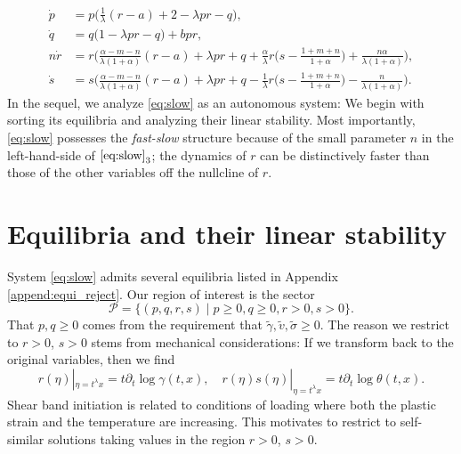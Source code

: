 \documentclass[11pt]{article}
\def\tg{{\tilde{\gamma}}}
\def\tv{{\tilde{v}}}
\def\ts{{\tilde{\sigma}}}
\theoremstyle{remark}
\begin{document}
\begin{equation}\label{eq:slow} \tag{S}
 \begin{aligned}
 \dot{p} &=p\Big(\frac{1}{\lambda}(r-a) + 2- \lambda p r -q\Big),\\
 \dot{q} &=q\Big(1 -\lambda p r -q\Big) + b p r,\\
 n\dot{r} &=r\Big(\frac{\alpha-m-n}{\lambda(1+\alpha)}(r-a) + \lambda pr + q +\frac{\alpha}{\lambda}r\big(s- \frac{1+m+n}{1+\alpha}\big) + \frac{n\alpha}{\lambda(1+\alpha)}\Big),\\
 \dot{s} &=s\Big(\frac{\alpha-m-n}{\lambda(1+\alpha)}(r-a) + \lambda pr + q - \frac{1}{\lambda}r\big(s- \frac{1+m+n}{1+\alpha}\big) - \frac{n}{\lambda(1+\alpha)}\Big).
 \end{aligned}
\end{equation}
In the sequel, we analyze \eqref{eq:slow} as an autonomous system: We begin with sorting its equilibria and analyzing their linear stability. Most importantly, \eqref{eq:slow} possesses the {\it fast-slow} structure because of the small parameter $n$ in the left-hand-side of $\eqref{eq:slow}_3$; the dynamics of $r$ can be distinctively faster than those of the other variables off the nullcline of $r$.




\section{Equilibria and their linear stability} \label{sec:equil}

System \eqref{eq:slow} admits several equilibria listed in Appendix \ref{append:equi_reject}.
Our region of interest is the sector
$$
\mathcal{P} = \{(p,q,r,s) \; | \; p\ge0, q\ge0, r>0, s>0 \}.
$$
That $p,q\ge0$ comes from the requirement that $\tg,\tv,\ts\ge0$. The reason we restrict to $r > 0$, $s > 0$
stems from mechanical considerations: If we transform back to the original variables, then we find
\begin{equation*}
 r(\eta)|_{\eta=t^\lambda x}=t\partial_t\log \gamma(t,x), \quad r(\eta)s(\eta)|_{\eta=t^\lambda x}=t\partial_t \log \theta(t,x).
\end{equation*}
Shear band initiation is related to conditions of loading where both the plastic strain and the temperature are increasing. This motivates to restrict to self-similar solutions
taking values in the region $r > 0$, $s > 0$.
\end{document}
